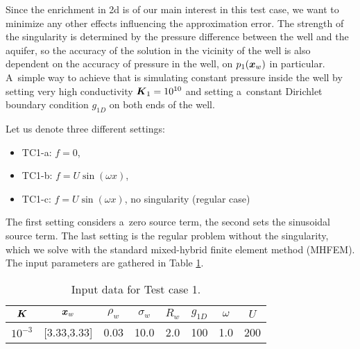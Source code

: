 Since the enrichment in 2d is of our main interest in this test case, we want to minimize any other effects
influencing the approximation error. The strength of the singularity is determined by the pressure difference
between the well and the aquifer, so the accuracy of the solution in the vicinity of the well is also dependent
on the accuracy of pressure in the well, on $p_1(\mathbf{\boldsymbol{x}}_w)$ in particular.
A~simple way to achieve that is simulating constant pressure inside the well by setting very high conductivity $\mathbf{\boldsymbol{K}}_1=10^{10}$
and setting a~constant Dirichlet boundary condition $g_{1D}$ on both ends of the well.

Let us denote three different settings: 
\begin{itemize}
    \item TC1-a: $f=0$,
    \item TC1-b: $f=U\sin(\omega x)$,
    \item TC1-c: $f=U\sin(\omega x)$, no singularity (regular case)
\end{itemize}
The first setting considers a~zero source term,
the second sets the sinusoidal source term.
The last setting is the regular problem without the singularity, which we solve with
the standard mixed-hybrid finite element method (MHFEM).
The input parameters are gathered in Table \ref{tab:tc1_data}.
%
\begin{table}[!hb]
\begin{center}
\begin{tabular}{cccccccc}
\toprule
$\mathbf{\boldsymbol{K}}$ & $\mathbf{\boldsymbol{x}}_w$  & $\rho_w$ & $\sigma_w$ & $R_w$ & $g_{1D}$ & $\omega$ & $U$ \\
\midrule
$10^{-3}$ & [3.33,3.33] & 0.03 & 10.0 & 2.0 & 100 & 1.0 & 200\\
\bottomrule
\end{tabular}
\caption{Input data for Test case 1.}
\label{tab:tc1_data}
\end{center}
\end{table}

